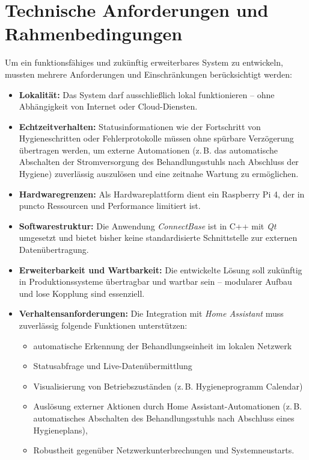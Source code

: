 \section{Technische Anforderungen und Rahmenbedingungen}

Um ein funktionsfähiges und zukünftig erweiterbares System zu entwickeln, mussten mehrere Anforderungen und Einschränkungen berücksichtigt werden:

\begin{itemize}
    \item \textbf{Lokalität:} Das System darf ausschließlich lokal funktionieren – ohne Abhängigkeit von Internet oder Cloud-Diensten.
    \item \textbf{Echtzeitverhalten:} Statusinformationen wie der Fortschritt von Hygieneschritten oder Fehlerprotokolle müssen ohne spürbare Verzögerung übertragen werden, um externe Automationen (z.\,B. das automatische Abschalten der Stromversorgung des Behandlungsstuhls nach Abschluss der Hygiene) zuverlässig auszulösen und eine zeitnahe Wartung zu ermöglichen.
    \item \textbf{Hardwaregrenzen:} Als Hardwareplattform dient ein Raspberry Pi 4, der in puncto Ressourcen und Performance limitiert ist.
    \item \textbf{Softwarestruktur:} Die Anwendung \textit{ConnectBase} ist in C++ mit \textit{Qt} umgesetzt und bietet bisher keine standardisierte Schnittstelle zur externen Datenübertragung.
    \item \textbf{Erweiterbarkeit und Wartbarkeit:} Die entwickelte Lösung soll zukünftig in Produktionssysteme übertragbar und wartbar sein – modularer Aufbau und lose Kopplung sind essenziell.
    \item \textbf{Verhaltensanforderungen:} Die Integration mit \textit{Home Assistant} muss zuverlässig folgende Funktionen unterstützen:
    \begin{itemize}
        \item automatische Erkennung der Behandlungseinheit im lokalen Netzwerk 
        \item Statusabfrage und Live-Datenübermittlung 
        \item Visualisierung von Betriebszuständen (z.\,B. Hygieneprogramm Calendar)
        \item Auslösung externer Aktionen durch Home Assistant-Automationen (z.\,B. automatisches Abschalten des Behandlungsstuhls nach Abschluss eines Hygieneplans),
        \item Robustheit gegenüber Netzwerkunterbrechungen und Systemneustarts.
    \end{itemize}
\end{itemize}

